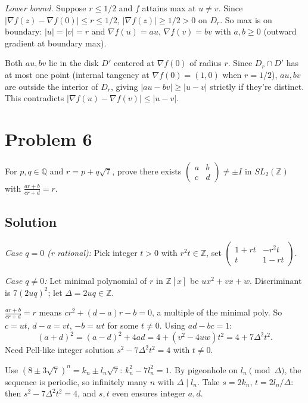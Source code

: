 \documentclass{article}
\begin{document}
\emph{Lower bound.} Suppose $r \le 1/2$ and $f$ attains max at $u \ne v$. Since $|\nabla f(z) - \nabla f(0)| \le r \le 1/2$, $|\nabla f(z)| \ge 1/2 > 0$ on $D_r$. So max is on boundary: $|u| = |v| = r$ and $\nabla f(u) = au$, $\nabla f(v) = bv$ with $a, b \ge 0$ (outward gradient at boundary max).

Both $au, bv$ lie in the disk $D'$ centered at $\nabla f(0)$ of radius $r$. Since $D_r \cap D'$ has at most one point (internal tangency at $\nabla f(0) = (1, 0)$ when $r = 1/2$), $au, bv$ are outside the interior of $D_r$, giving $|au - bv| \ge |u - v|$ strictly if they're distinct. This contradicts $|\nabla f(u) - \nabla f(v)| \le |u - v|$.

\section*{Problem 6}
For $p, q \in \mathbb{Q}$ and $r = p + q \sqrt 7$, prove there exists $\begin{pmatrix}a & b\\c & d\end{pmatrix} \ne \pm I$ in $SL_2(\mathbb{Z})$ with $\tfrac{ar + b}{cr + d} = r$.

\subsection*{Solution}
\emph{Case $q = 0$ (r rational):} Pick integer $t > 0$ with $r^2 t \in \mathbb{Z}$, set $\begin{pmatrix}1 + rt & -r^2 t \\ t & 1 - rt\end{pmatrix}$.

\emph{Case $q \ne 0$:} Let minimal polynomial of $r$ in $\mathbb{Z}[x]$ be $u x^2 + v x + w$. Discriminant is $7(2uq)^2$; let $\Delta = 2uq \in \mathbb{Z}$.

$\tfrac{ar+b}{cr+d} = r$ means $c r^2 + (d-a) r - b = 0$, a multiple of the minimal poly. So $c = ut$, $d - a = vt$, $-b = wt$ for some $t \ne 0$. Using $ad - bc = 1$:
\[
(a + d)^2 = (a - d)^2 + 4 ad = 4 + (v^2 - 4uw) t^2 = 4 + 7 \Delta^2 t^2.
\]
Need Pell-like integer solution $s^2 - 7 \Delta^2 t^2 = 4$ with $t \ne 0$.

Use $(8 \pm 3\sqrt 7)^n = k_n \pm l_n \sqrt 7$: $k_n^2 - 7 l_n^2 = 1$. By pigeonhole on $l_n \pmod \Delta$, the sequence is periodic, so infinitely many $n$ with $\Delta \mid l_n$. Take $s = 2 k_n$, $t = 2 l_n / \Delta$: then $s^2 - 7 \Delta^2 t^2 = 4$, and $s, t$ even ensures integer $a, d$.
\end{document}
